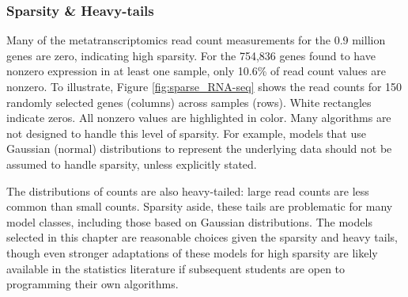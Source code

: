 \subsubsection{Sparsity \& Heavy-tails}
Many of the metatranscriptomics read count measurements for the 0.9 million genes are zero, indicating high sparsity.
For the 754,836 genes found to have nonzero expression in at least one sample, only 10.6\% of read count values are nonzero.
To illustrate, Figure \ref{fig:sparse_RNA-seq} shows the read counts for 150 randomly selected genes (columns) across samples (rows).
White rectangles indicate zeros.  All nonzero values are highlighted in color.
Many algorithms are not designed to handle this level of sparsity.
For example, models that use Gaussian (normal) distributions to represent the underlying data should not be assumed to handle sparsity, unless explicitly stated.

The distributions of counts are also heavy-tailed: large read counts are less common than small counts.
Sparsity aside, these tails are problematic for many model classes, including those based on Gaussian distributions.
The models selected in this chapter are reasonable choices given the sparsity and heavy tails, though even stronger adaptations of these models for high sparsity are likely available in the statistics literature if subsequent students are open to programming their own algorithms.



